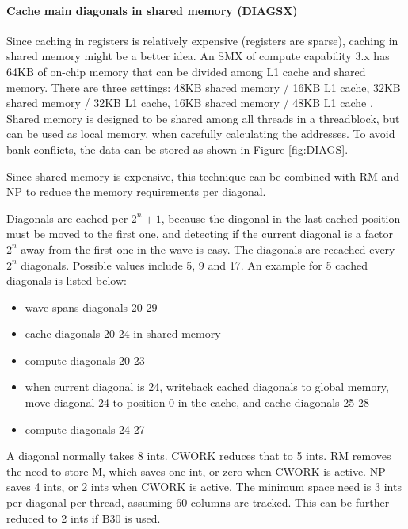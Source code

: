 \documentclass[../main/thesis.tex]{subfiles}
\begin{document}
\paragraph{Cache main diagonals in shared memory (DIAGSX)}
Since caching in registers is relatively expensive (registers are sparse), caching in shared memory might be a better idea.
An SMX of compute capability 3.x has 64KB of on-chip memory that can be divided among L1 cache and shared memory.
There are three settings: 48KB shared memory / 16KB L1 cache, 32KB shared memory / 32KB L1 cache, 16KB shared memory / 48KB L1 cache \cite{shared_mem}.
Shared memory is designed to be shared among all threads in a threadblock, but can be used as local memory, when carefully calculating the addresses.
To avoid bank conflicts, the data can be stored as shown in Figure \ref{fig:DIAGS}.


Since shared memory is expensive, this technique can be combined with RM and NP to reduce the memory requirements per diagonal.

Diagonals are cached per $2^n+1$, because the diagonal in the last cached position must be moved to the first one, and detecting if the current diagonal is a factor $2^n$ away from the first one in the wave is easy.
The diagonals are recached every $2^n$ diagonals.
Possible values include 5, 9 and 17.
An example for 5 cached diagonals is listed below:

\begin{itemize}
\item wave spans diagonals 20-29
\item cache diagonals 20-24 in shared memory
\item compute diagonals 20-23
\item when current diagonal is 24, writeback cached diagonals to global memory, move diagonal 24 to position 0 in the cache, and cache diagonals 25-28
\item compute diagonals 24-27
\end{itemize}

A diagonal normally takes 8 ints.
CWORK reduces that to 5 ints.
RM removes the need to store M, which saves one int, or zero when CWORK is active.
NP saves 4 ints, or 2 ints when CWORK is active.
The minimum space need is 3 ints per diagonal per thread, assuming 60 columns are tracked.
This can be further reduced to 2 ints if B30 is used.
\end{document}

